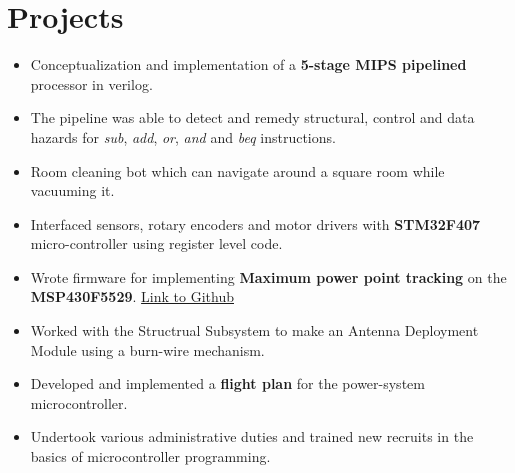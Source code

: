 \documentclass{resume}
\begin{document}
\section{Projects}
\begin{itemize}\setlength{\itemsep}{0pt}\setlength{\parskip}{0pt}\vspace{-0.2cm}
    \item Conceptualization and implementation of a \textbf{5-stage MIPS pipelined} processor in verilog.
    \item The pipeline was able to detect and remedy structural, control and data hazards for \emph{sub}, \emph{add}, \emph{or}, \emph{and} and \emph{beq} instructions.
\end{itemize}
\vspace{-0.1cm}
\begin{itemize}\setlength{\itemsep}{0pt}\setlength{\parskip}{0pt}\vspace{-0.2cm}
    \item Room cleaning bot which can navigate around a square room while vacuuming it.
    \item Interfaced sensors, rotary encoders and motor drivers with \textbf{STM32F407} micro-controller using register level code.
\end{itemize}
\vspace{-0.2cm}
\begin{itemize}\setlength{\itemsep}{0pt}\setlength{\parskip}{0pt}\vspace{0cm}
    \item Wrote firmware for implementing \textbf{Maximum power point tracking} on the \textbf{MSP430F5529}. {\href{https://github.com/parthkharade/MSP430F5529}{Link to Github}}
    \item Worked with the Structrual Subsystem to make an Antenna Deployment Module using a burn-wire mechanism.
    \item Developed and implemented a \textbf{flight plan} for the power-system microcontroller.
    \item Undertook various administrative duties and trained new recruits in the basics of microcontroller programming.
\end{itemize}
\end{document}

